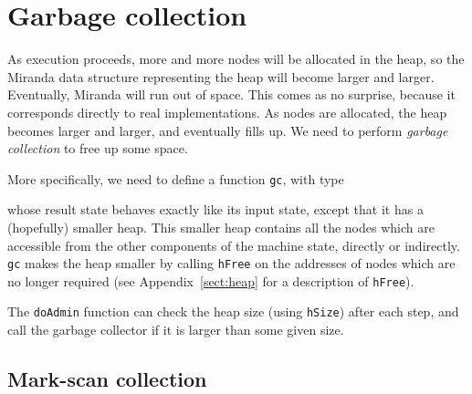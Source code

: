 \section{Garbage collection\advanced}

As execution proceeds, more and more nodes will be allocated in the
heap, so the Miranda data structure representing the heap will become
larger and larger.  Eventually, Miranda will run out of space.  This
comes as no surprise, because it corresponds directly to real
implementations.  As nodes are allocated, the heap becomes larger and
larger, and eventually fills up.  We need to perform {\em garbage
collection\/} to free up some space.

More specifically, we need to define a function \mbox{\tt gc}, with type


whose result state behaves exactly like its input state, except that
it has a (hopefully) smaller heap.  This smaller heap contains all the
nodes which are accessible from the other components of the machine
state, directly or indirectly.  \mbox{\tt gc} makes the heap smaller by
calling \mbox{\tt hFree} on the addresses of nodes which are no longer required
(see Appendix~\ref{sect:heap} for a description of \mbox{\tt hFree}).

The \mbox{\tt doAdmin} function can check the
heap size (using \mbox{\tt hSize}) after each step, and call the garbage collector
if it is larger than some given size.

\subsection{Mark-scan collection}

